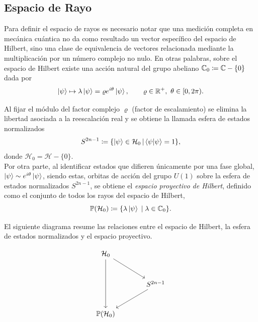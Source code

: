 \documentclass[../Main.tex]{subfiles}
\begin{document}
\subsection{Espacio de Rayo}

Para definir el espacio de rayos es necesario notar que una medición completa
en mecánica cuántica no da como resultado un vector específico del espacio de
Hilbert, sino una clase de equivalencia de vectores relacionada mediante la
multiplicación por un número complejo no nulo. En otras palabras, sobre el
espacio de Hilbert existe una acción natural del grupo abeliano
$\mathbb{C}_0  \coloneqq  \mathbb{C} - \{0\}$ dada por
\begin{equation}
    \ket{\psi} \mapsto \lambda \ket{\psi}
    = \varrho  e^{i \theta} \ket{\psi},
    \qquad
    \varrho \in \mathbb{R}^{+}, \ \theta \in [0,2\pi).
\end{equation}

Al fijar el módulo del factor complejo $\varrho$ (factor de escalamiento) se elimina la
libertad asociada a la reescalación real y se obtiene la llamada esfera de
estados normalizados
\begin{equation}
    S^{2n-1}
     \coloneqq 
    \qty{
        \ket{\psi} \in \H_0
        \,\middle|\,
        \ip{\psi} = 1
    },
    \label{def:esfera_estados_normalizados}
\end{equation}
donde $\mathcal{H}_0=\mathcal{H}-\{0\}$.\\ Por otra parte, al identificar estados que difieren únicamente por una fase
global, $\ket{\psi} \sim  e^{i\theta}\ket{\psi}$, siendo estas, orbitas de acción del grupo $U(1)$ sobre la esfera de estados normalizados $S^{2n-1}$, se obtiene el \emph{espacio
proyectivo de Hilbert}, definido como el conjunto de todos los rayos del espacio
de Hilbert,
\begin{equation}
    \mathbb{P}(\mathcal{H}_0)
     \coloneqq  \{\lambda\ket{\psi}\;|\; \lambda\in \mathbb{C}_0\}.
    \label{def:espacio_proyectivo_hilbert}
\end{equation}


El siguiente diagrama resume las relaciones entre el espacio de Hilbert,
la esfera de estados normalizados y el espacio proyectivo.

\[
\begin{tikzcd}[column sep=large, row sep=large]
\H_0
\arrow[dd]
\arrow[rd] 
&  \\
& S^{2n-1}
\arrow[ld] \\
\Proj(\H_0)
\end{tikzcd}
\]
\end{document}
